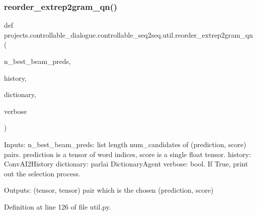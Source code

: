 \subsubsection{\texorpdfstring{reorder\+\_\+extrep2gram\+\_\+qn()}{reorder\_extrep2gram\_qn()}}
{\footnotesize\ttfamily def projects.\+controllable\+\_\+dialogue.\+controllable\+\_\+seq2seq.\+util.\+reorder\+\_\+extrep2gram\+\_\+qn (\begin{DoxyParamCaption}\item[{}]{n\+\_\+best\+\_\+beam\+\_\+preds,  }\item[{}]{history,  }\item[{}]{dictionary,  }\item[{}]{verbose }\end{DoxyParamCaption})}

\begin{DoxyVerb}Inputs:
    n_best_beam_preds: list length num_candidates of (prediction, score) pairs.
      prediction is a tensor of word indices, score is a single float tensor.
    history: ConvAI2History
    dictionary: parlai DictionaryAgent
    verbose: bool. If True, print out the selection process.

Outputs: (tensor, tensor) pair which is the chosen (prediction, score)
\end{DoxyVerb}
 

Definition at line 126 of file util.\+py.


